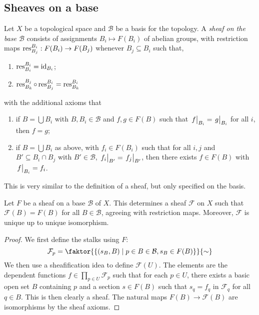 \subsection{Sheaves on a base}
\begin{definition}
    Let \( X \) be a topological space and \( \mathcal B \) be a basis for the topology.
    A \emph{sheaf on the base \( \mathcal B \)} consists of assignments \( B_i \mapsto F(B_i) \) of abelian groups, with restriction maps \( \operatorname{res}_{B_j}^{B_i} : F(B_i) \to F(B_j) \) whenever \( B_j \subseteq B_i \) such that,
    \begin{enumerate}
        \item \( \operatorname{res}^{B_i}_{B_i} = \operatorname{id}_{B_i} \);
        \item \( \operatorname{res}^{B_j}_{B_k} \circ \operatorname{res}^{B_i}_{B_j} = \operatorname{res}^{B_i}_{B_k} \)
    \end{enumerate}
    with the additional axioms that
    \begin{enumerate}
        \item if \( B = \bigcup B_i \) with \( B, B_i \in \mathcal B \) and \( f, g \in F(B) \) such that \( \eval{f}_{B_i} = \eval{g}_{B_i} \) for all \( i \), then \( f = g \);
        \item if \( B = \bigcup B_i \) as above, with \( f_i \in F(B_i) \) such that for all \( i, j \) and \( B' \subseteq B_i \cap B_j \) with \( B' \in \mathcal B \), \( \eval{f_i}_{B'} = \eval{f_j}_{B'} \), then there exists \( f \in F(B) \) with \( \eval{f}_{B_i} = f_i \).
    \end{enumerate}
\end{definition}
This is very similar to the definition of a sheaf, but only specified on the basis.
\begin{proposition}
    Let \( F \) be a sheaf on a base \( \mathcal B \) of \( X \).
    This determines a sheaf \( \mathcal F \) on \( X \) such that \( \mathcal F(B) = F(B) \) for all \( B \in \mathcal B \), agreeing with restriction maps.
    Moreover, \( \mathcal F \) is unique up to unique isomorphism.
\end{proposition}
\begin{proof}
    We first define the stalks using \( F \):
    \[ \mathcal F_p = \faktor{\qty{(s_B, B) \mid p \in B \in \mathcal B, s_B \in F(B)}}{\sim} \]
    We then use a sheafification idea to define \( \mathcal F(U) \).
    The elements are the dependent functions \( f \in \prod_{p \in U} \mathcal F_p \) such that for each \( p \in U \), there exists a basic open set \( B \) containing \( p \) and a section \( s \in F(B) \) such that \( s_q = f_q \) in \( \mathcal F_q \) for all \( q \in B \).
    This is then clearly a sheaf.
    The natural maps \( F(B) \to \mathcal F(B) \) are isomorphisms by the sheaf axioms.
\end{proof}

